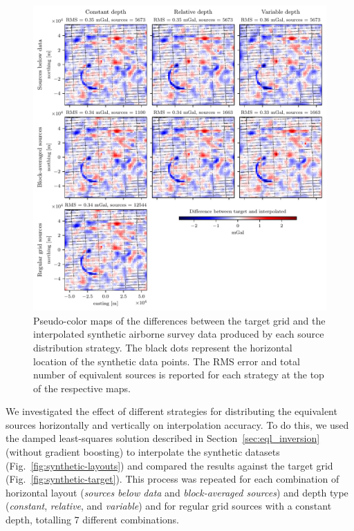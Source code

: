 \begin{figure}
    \includegraphics[width=\linewidth]{figs/airborne_survey_differences.pdf}
    \caption{
        Pseudo-color maps of the differences between the target grid and the
        interpolated synthetic airborne survey data produced by each source
        distribution strategy.
        The black dots represent the horizontal location of the synthetic data
        points. The RMS error and total number of equivalent sources is
        reported for each strategy at the top of the respective maps.
    }
    \label{fig:airborne-survey-differences}
\end{figure}

We investigated the effect of different strategies for distributing the
equivalent sources horizontally and vertically on interpolation accuracy.
To do this, we used the damped least-squares solution described in
Section~\ref{sec:eql_inversion} (without gradient boosting) to interpolate the
synthetic datasets (Fig.~\ref{fig:synthetic-layouts}) and compared the results
against the target grid (Fig.~\ref{fig:synthetic-target}).
This process was repeated for each combination of horizontal layout
(\emph{sources below data} and \emph{block-averaged sources}) and depth type
(\emph{constant}, \emph{relative}, and \emph{variable}) and for regular grid
sources with a constant depth, totalling 7 different combinations.

